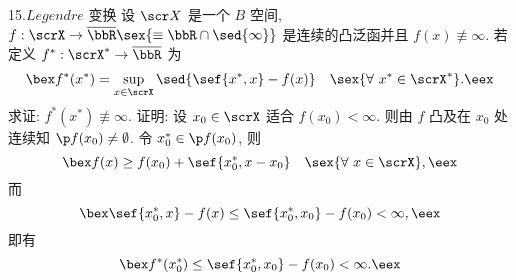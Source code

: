 15.$Legendre$ 变换
 设 $\scr X$ 是一个 $B$ 空间, $f:\scrX\to \overline{\bbR}\sex{\equiv \bbR\cap\sed{\infty}}$ 是连续的凸泛函并且 $f(x)\not\equiv \infty$. 若定义 $f^*:\scrX^*\to \overline{\bbR}$ 为 $$\bex f^*(x^*)=\sup_{x\in\scrX}\sed{\sef{x^*,x}-f(x)}\quad\sex{\forall\ x^*\in \scrX^*}. \eex$$ 求证: $f^*(x^*)\not\equiv \infty$.
证明: 设 $x_0\in \scrX$ 适合 $f(x_0)<\infty$. 则由 $f$ 凸及在 $x_0$ 处连续知 $\p f(x_0)\neq \emptyset$. 令 $x_0^*\in \p f(x_0)$, 则 $$\bex f(x)\geq f(x_0)+\sef{x_0^*,x-x_0}\quad\sex{\forall\ x\in\scrX}, \eex$$ 而 $$\bex \sef{x_0^*,x}-f(x) \leq \sef{x_0^*,x_0}-f(x_0)<\infty, \eex$$ 即有 $$\bex f^*(x_0^*)\leq\sef{x_0^*,x_0}-f(x_0)<\infty. \eex$$

